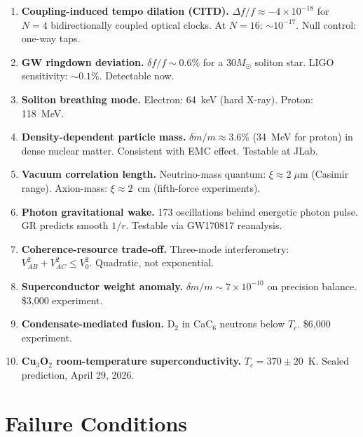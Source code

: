 \documentclass[11pt, a4paper]{article}
\begin{document}
\begin{enumerate}[label=P\arabic*.]
  \item \textbf{Coupling-induced tempo dilation (CITD).}
    $\Delta f/f \approx -4 \times 10^{-18}$ for $N = 4$
    bidirectionally coupled optical clocks. At $N = 16$:
    $\sim 10^{-17}$. Null control: one-way taps.

  \item \textbf{GW ringdown deviation.}
    $\delta f/f \sim 0.6\%$ for a $30M_\odot$ soliton star.
    LIGO sensitivity: $\sim 0.1\%$. Detectable now.

  \item \textbf{Soliton breathing mode.}
    Electron: 64~keV (hard X-ray). Proton: 118~MeV.

  \item \textbf{Density-dependent particle mass.}
    $\delta m/m \approx 3.6\%$ (34~MeV for proton) in dense
    nuclear matter. Consistent with EMC effect. Testable at JLab.

  \item \textbf{Vacuum correlation length.}
    Neutrino-mass quantum: $\xi \approx 2\;\mu$m (Casimir range).
    Axion-mass: $\xi \approx 2$~cm (fifth-force experiments).

  \item \textbf{Photon gravitational wake.}
    173 oscillations behind energetic photon pulse. GR predicts
    smooth $1/r$. Testable via GW170817 reanalysis.

  \item \textbf{Coherence-resource trade-off.}
    Three-mode interferometry:
    $V_{AB}^2 + V_{AC}^2 \leq V_0^2$. Quadratic, not exponential.

  \item \textbf{Superconductor weight anomaly.}
    $\delta m/m \sim 7 \times 10^{-10}$ on precision balance.
    \$3,000 experiment.

  \item \textbf{Condensate-mediated fusion.}
    D$_2$ in CaC$_6$ neutrons below $T_c$. \$6,000 experiment.

  \item \textbf{Cu$_3$O$_2$ room-temperature superconductivity.}
    $T_c = 370 \pm 20$~K. Sealed prediction, April 29, 2026.
\end{enumerate}

\section{Failure Conditions}
\end{document}
